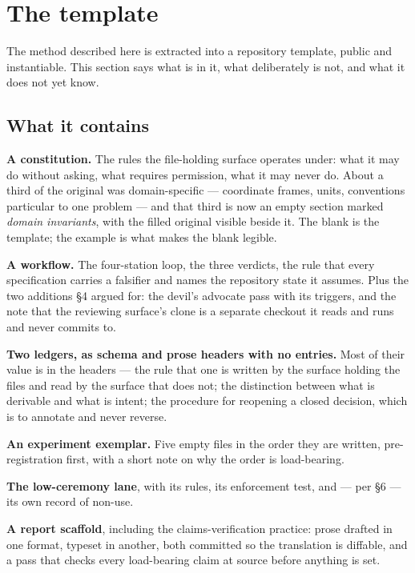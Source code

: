 \section{The template}

The method described here is extracted into a repository template, public and instantiable. This section says what is in it, what deliberately is not, and what it does not yet know.

\subsection{What it contains}

\textbf{A constitution.} The rules the file-holding surface operates under: what it may do without asking, what requires permission, what it may never do. About a third of the original was domain-specific --- coordinate frames, units, conventions particular to one problem --- and that third is now an empty section marked \textit{domain invariants}, with the filled original visible beside it. The blank is the template; the example is what makes the blank legible.

\textbf{A workflow.} The four-station loop, the three verdicts, the rule that every specification carries a falsifier and names the repository state it assumes. Plus the two additions \S4 argued for: the devil's advocate pass with its triggers, and the note that the reviewing surface's clone is a separate checkout it reads and runs and never commits to.

\textbf{Two ledgers, as schema and prose headers with no entries.} Most of their value is in the headers --- the rule that one is written by the surface holding the files and read by the surface that does not; the distinction between what is derivable and what is intent; the procedure for reopening a closed decision, which is to annotate and never reverse.

\textbf{An experiment exemplar.} Five empty files in the order they are written, pre-registration first, with a short note on why the order is load-bearing.

\textbf{The low-ceremony lane}, with its rules, its enforcement test, and --- per \S6 --- its own record of non-use.

\textbf{A report scaffold}, including the claims-verification practice: prose drafted in one format, typeset in another, both committed so the translation is diffable, and a pass that checks every load-bearing claim at source before anything is set.

